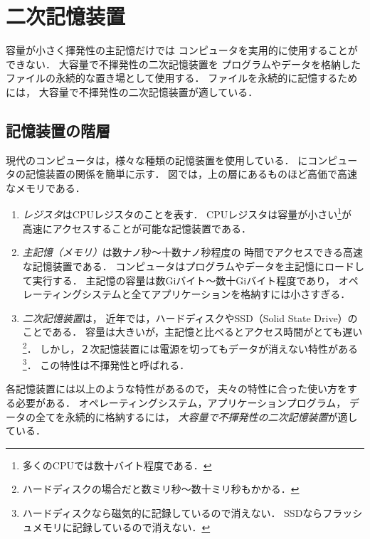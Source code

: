 \chapter{二次記憶装置}

容量が小さく揮発性の主記憶だけでは
コンピュータを実用的に使用することができない．
大容量で不揮発性の二次記憶装置を
プログラムやデータを格納したファイルの永続的な置き場として使用する．
ファイルを永続的に記憶するためには，
大容量で不揮発性の二次記憶装置が適している．

\section{記憶装置の階層}
現代のコンピュータは，様々な種類の記憶装置を使用している．
にコンピュータの記憶装置の関係を簡単に示す．
図では，上の層にあるものほど高価で高速なメモリである．

\begin{enumerate}
\item \emph{レジスタ}はCPUレジスタのことを表す．
  CPUレジスタは容量が小さい\footnote{多くのCPUでは数十バイト程度である．}が
  高速にアクセスすることが可能な記憶装置である．

\item \emph{主記憶（メモリ）}は数ナノ秒〜十数ナノ秒程度の
  時間でアクセスできる高速な記憶装置である．
  コンピュータはプログラムやデータを主記憶にロードして実行する．
  主記憶の容量は数Giバイト〜数十Giバイト程度であり，
  オペレーティングシステムと全てアプリケーションを格納すには小さすぎる．

\item \emph{二次記憶装置}は，
  近年では，ハードディスクやSSD（Solid State Drive）のことである．
  容量は大きいが，主記憶と比べるとアクセス時間がとても遅い\footnote{
    ハードディスクの場合だと数ミリ秒〜数十ミリ秒もかかる．}．
  しかし，２次記憶装置には電源を切ってもデータが消えない特性がある\footnote{
    ハードディスクなら磁気的に記録しているので消えない．
    SSDならフラッシュメモリに記録しているので消えない．}．
  この特性は不揮発性と呼ばれる．
\end{enumerate}


各記憶装置には以上のような特性があるので，
夫々の特性に合った使い方をする必要がある．
オペレーティングシステム，アプリケーションプログラム，
データの全てを永続的に格納するには，
\emph{大容量で不揮発性の二次記憶装置}が適している．

